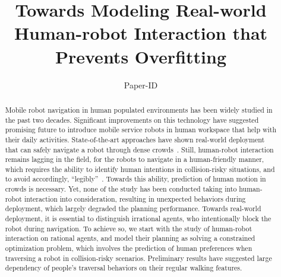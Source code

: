 \documentclass[conference]{IEEEtran}
\begin{document}
\title{Towards Modeling Real-world Human-robot Interaction that Prevents Overfitting}

\author{Paper-ID}



\maketitle

\begin{abstract}
Mobile robot navigation in human populated environments has been widely studied in the past two decades. Significant improvements on this technology have suggested promising future to introduce mobile service robots in human workspace that help with their daily activities. State-of-the-art approaches have shown real-world deployment that can safely navigate a robot through dense crowds~\cite{trautman2015robot, pfeiffer2016predicting}. Still, human-robot interaction remains lagging in the field, for the robots to navigate in a human-friendly manner, which requires the ability to identify human intentions in collision-risky situations, and to avoid accordingly, “legibly”~\cite{dragan2013legibility}. Towards this ability, prediction of human motion in crowds is necessary. Yet, none of the study has been conducted taking into human-robot interaction into consideration, resulting in unexpected behaviors during deployment, which largely degraded the planning performance. Towards real-world deployment, it is essential to distinguish irrational agents, who intentionally block the robot during navigation. To achieve so, we start with the study of human-robot interaction on rational agents, and model their planning as solving a constrained optimization problem, which involves the prediction of human preferences when traversing a robot in collision-risky scenarios. Preliminary results have suggested large dependency of people’s traversal behaviors on their regular walking features. 

\end{abstract}

\IEEEpeerreviewmaketitle

\end{document}
